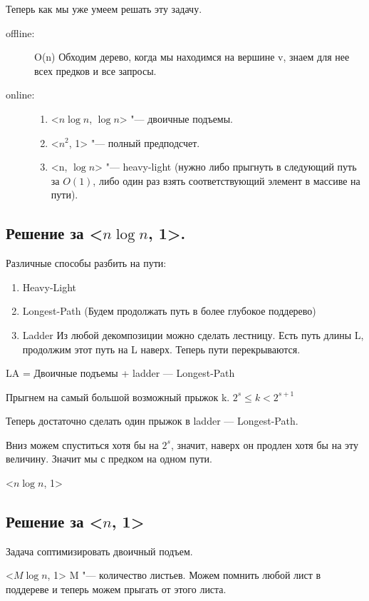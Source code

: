 Теперь как мы уже умеем решать эту задачу.
\begin{description}
\item[offline:] O(n) Обходим дерево, когда мы находимся на вершине v, знаем для нее всех предков и все запросы.
\item[online:] 
       \begin{enumerate}
       \item <$n\log n$, $\log n$> "--- двоичные подъемы.
       \item <$n^2$, 1> "--- полный предподсчет.
       \item <n, $\log n$> "--- heavy-light (нужно либо прыгнуть в следующий путь за $O(1)$, либо один раз взять соответствующий элемент в массиве на пути).
     \end{enumerate}
\end{description}

\subsection{Решение за <$n\log n$, 1>.}

Различные способы разбить на пути:
\begin{enumerate}
\item Heavy-Light
\item Longest-Path (Будем продолжать путь в более глубокое поддерево)
\item Ladder Из любой декомпозиции можно сделать лестницу. Есть путь длины L, продолжим этот путь на L наверх. Теперь пути перекрываются.
\end{enumerate}

LA = Двоичные подъемы + ladder --- Longest-Path

Прыгнем на самый большой возможный прыжок k. $2^s \le k < 2^{s + 1}$

Теперь достаточно сделать один прыжок в ladder --- Longest-Path.

Вниз можем спуститься хотя бы на $2^s$, значит, наверх он продлен хотя бы на эту величину. Значит мы с предком на одном пути. 

<$n\log n$, 1>

\subsection{Решение за <$n$, 1>}
Задача  соптимизировать двоичный подъем. 

<$M\log n$, 1>
M "--- количество листьев. Можем помнить любой лист в поддереве и теперь можем прыгать от этого листа. 

